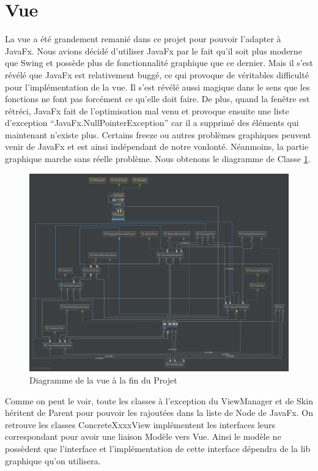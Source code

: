 \documentclass[report, backcover, french, nodocumentinfo]{upmethodology-document}
\begin{document}
		\section{Vue}
			\p{}
			La vue a été grandement remanié dans ce projet pour pouvoir l'adapter à JavaFx. Nous avions décidé d'utiliser JavaFx par le fait qu'il soit plus moderne que Swing et possède plus de fonctionnalité graphique que ce dernier. Mais il s'est révélé que JavaFx est relativement buggé, ce qui provoque de véritables difficulté pour l'implémentation de la vue. Il s'est révélé aussi magique dans le sens que les fonctions ne font pas forcément ce qu'elle doit faire. De plus, quand la fenêtre est rétréci, JavaFx fait de l'optimisation mal venu et provoque ensuite une liste d'exception ``JavaFx.NullPointerException'' car il a supprimé des éléments qui maintenant n'existe plus. Certains freeze ou autres problèmes graphiques peuvent venir de JavaFx et est ainsi indépendant de notre vonlonté.
			\p{}
			Néanmoins, la partie graphique marche sans réelle problème. Nous obtenons le diagramme de Classe \ref{fig:ViewDiagramm}.
			\begin{figure}[h!]
				\centering
				\includegraphics[width=\textwidth]{figures/ViewClassDiagrammFinal.png}
				\caption{Diagramme de la vue à la fin du Projet}
				\label{fig:ViewDiagramm}
			\end{figure}
			Comme on peut le voir, toute les classes à l'exception du ViewManager et de Skin héritent de Parent pour pouvoir les rajoutées dans la liste de Node de JavaFx. On retrouve les classes ConcreteXxxxView implémentent les interfaces leurs correspondant pour avoir une liaison Modèle vers Vue. Ainsi le modèle ne possèdent que l'interface et l'implémentation de cette interface dépendra de la lib graphique qu'on utilisera.
\end{document}
